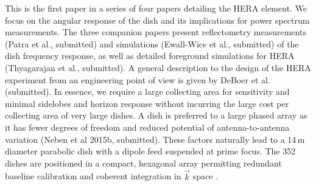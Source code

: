 \documentclass[preprint]{aastex}
\begin{document}

This is the first paper in a series of four papers detailing the HERA element. We focus on the 
angular response of the dish and its implications for power spectrum measurements. The three companion 
papers present reflectometry measurements (Patra et al., submitted) and simulations (Ewall-Wice et al., 
submitted) of the dish frequency response, as well as detailed 
foreground simulations for HERA (Thyagarajan et al., submitted). A general description to the design of the 
HERA experiment from an engineering point of view is given by DeBoer et al. (submitted). In essence, we 
require a large collecting area for
 sensitivity and minimal sidelobes and horizon response without incurring the large cost per collecting 
area of very large dishes. A dish is preferred to a large phased array as it has fewer degrees 
of freedom and reduced potential of antenna-to-antenna variation (Neben et al 2015b, 
submitted). These factors naturally lead to a 14\,m diameter parabolic dish with a dipole 
feed suspended at prime focus. The 352 dishes are positioned in a compact, hexagonal 
array permitting redundant baseline calibration and coherent integration in $
\vec{k}$ space \citep{omniscope,ali2015}. 
\end{document}
